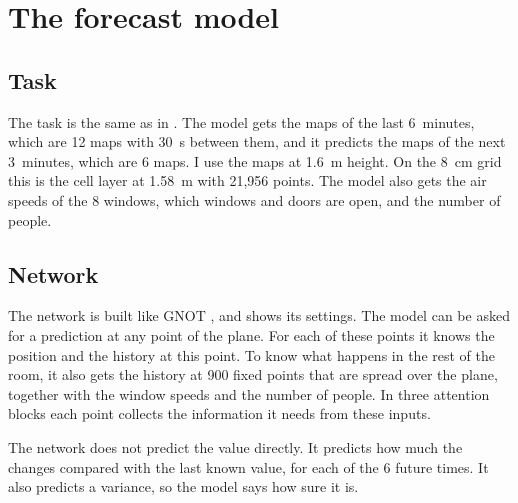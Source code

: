 \chapter{The forecast model}
\label{ch:model}

\section{Task}
The task is the same as in \citet{bian2025}. The model gets the \cotwo{} maps of the last 6~minutes, which are
12 maps with 30~s between them, and it predicts the \cotwo{} maps of the next 3~minutes, which are 6 maps. I
use the maps at 1.6~m height. On the 8~cm grid this is the cell layer at 1.58~m with 21,956 points. The model
also gets the air speeds of the 8 windows, which windows and doors are open, and the number of people.

\section{Network}
The network is built like GNOT \citep{hao2023gnot}, and  shows its settings. The model can be
asked for a prediction at any point of the plane. For each of these points it knows the position and the
\cotwo{} history at this point. To know what happens in the rest of the room, it also gets the \cotwo{} history
at 900 fixed points that are spread over the plane, together with the window speeds and the number of people.
In three attention blocks each point collects the information it needs from these inputs.

The network does not predict the \cotwo{} value directly. It predicts how much the \cotwo{} changes compared
with the last known value, for each of the 6 future times. It also predicts a variance, so the model says how
sure it is.

